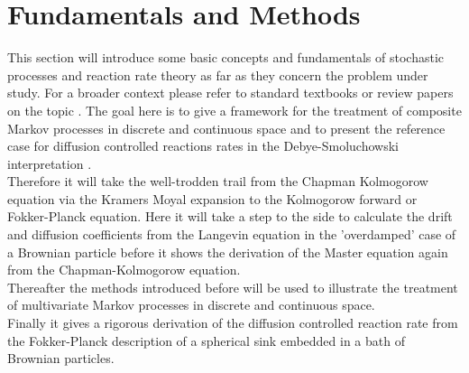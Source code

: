 
\section{Fundamentals and Methods}
\label{Short_Introduction_to_Stochastic_Processes}
This section will introduce some basic concepts and fundamentals of stochastic processes and reaction rate theory as far as they concern the problem under study. For a broader context please refer to standard textbooks \cite{VanKampen1992} or review papers on the topic \cite{Calef1983a, Bressloff2013}. The goal here is to give a framework for the treatment of composite Markov processes in discrete and continuous space and to present the reference case for diffusion controlled reactions rates in the Debye-Smoluchowski interpretation \cite{Smoluchowski1917a, Debye1942}. \\
Therefore it will take the well-trodden trail from the Chapman Kolmogorow equation via the Kramers Moyal expansion to the Kolmogorow forward or Fokker-Planck equation. Here it will take a step to the side to calculate the drift and diffusion coefficients from the Langevin equation in the 'overdamped' case of a Brownian particle before it shows the derivation of the Master equation again from the Chapman-Kolmogorow equation.\\
Thereafter the methods introduced before will be used to illustrate the treatment of multivariate Markov processes in discrete and continuous space. \\
Finally it gives a rigorous derivation of the diffusion controlled reaction rate from the Fokker-Planck description of a spherical sink embedded in a bath of Brownian particles.

